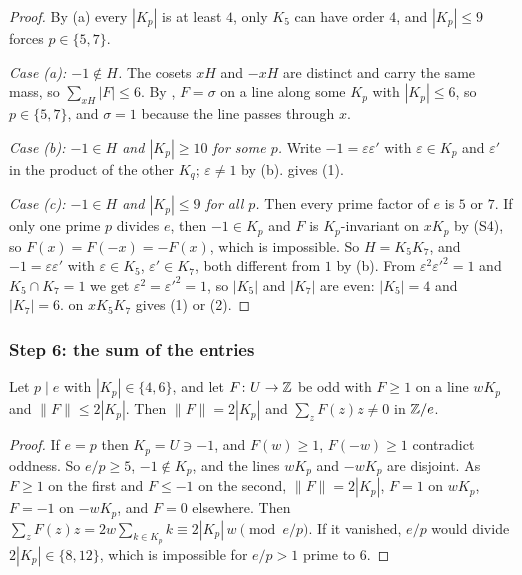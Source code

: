 \begin{proof}
By (a) every $|K_{p}|$ is at least $4$, only $K_{5}$ can have
order $4$, and $|K_{p}|\le9$ forces $p\in\{5,7\}$.

\emph{Case (a): $-1\notin H$.} The cosets $xH$ and $-xH$ are distinct and
carry the same mass, so $\sum_{xH}|F|\le6$. By , $F=\sigma$ on
a line along some $K_{p}$ with $|K_{p}|\le6$, so $p\in\{5,7\}$, and $\sigma=1$
because the line passes through $x$.

\emph{Case (b): $-1\in H$ and $|K_{p}|\ge10$ for some $p$.} Write
$-1=\varepsilon\varepsilon'$ with $\varepsilon\in K_{p}$ and $\varepsilon'$
in the product of the other $K_{q}$; $\varepsilon\ne1$ by (b).
 gives (1).

\emph{Case (c): $-1\in H$ and $|K_{p}|\le9$ for all $p$.} Then every prime
factor of $e$ is $5$ or $7$. If only one prime $p$ divides $e$, then $-1\in
K_{p}$ and $F$ is $K_{p}$-invariant on $xK_{p}$ by (S4), so
$F(x)=F(-x)=-F(x)$, which is impossible. So $H=K_{5}K_{7}$, and
$-1=\varepsilon\varepsilon'$ with $\varepsilon\in K_{5}$, $\varepsilon'\in
K_{7}$, both different from $1$ by (b). From
$\varepsilon^{2}\varepsilon'^{2}=1$ and $K_{5}\cap K_{7}=1$ we get
$\varepsilon^{2}=\varepsilon'^{2}=1$, so $|K_{5}|$ and $|K_{7}|$ are even:
$|K_{5}|=4$ and $|K_{7}|=6$.  on $xK_{5}K_{7}$ gives (1) or
(2).
\end{proof}

\subsubsection*{Step 6: the sum of the entries}

\begin{lemma}\label{lem:killline}
Let $p\mid e$ with $|K_{p}|\in\{4,6\}$, and let $F\colon U\to\mathbb{Z}$ be odd with
$F\ge1$ on a line $wK_{p}$ and $\|F\|\le2|K_{p}|$. Then $\|F\|=2|K_{p}|$ and
$\sum_{z}F(z)z\ne0$ in $\mathbb{Z}/e$.
\end{lemma}

\begin{proof}
If $e=p$ then $K_{p}=U\ni-1$, and $F(w)\ge1$, $F(-w)\ge1$ contradict
oddness. So $e/p\ge5$, $-1\notin K_{p}$, and the lines $wK_{p}$ and
$-wK_{p}$ are disjoint. As $F\ge1$ on the first and $F\le-1$ on the second,
$\|F\|=2|K_{p}|$, $F=1$ on $wK_{p}$, $F=-1$ on $-wK_{p}$, and $F=0$
elsewhere. Then $\sum_{z}F(z)z=2w\sum_{k\in K_{p}}k\equiv2|K_{p}|\,w\pmod
{e/p}$. If it vanished, $e/p$ would divide $2|K_{p}|\in\{8,12\}$, which is
impossible for $e/p>1$ prime to $6$.
\end{proof}

